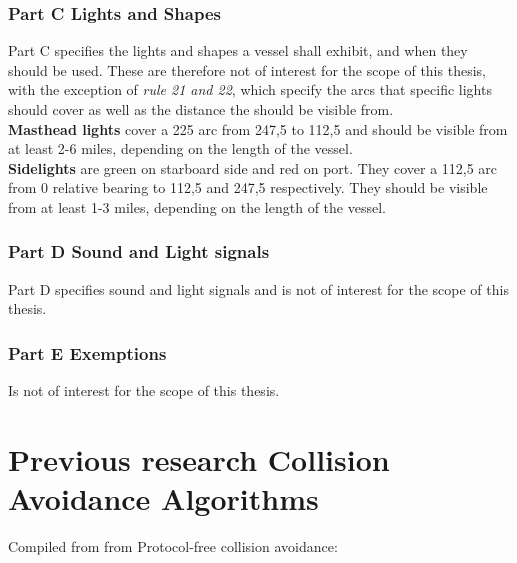 \subsubsection{Part C Lights and Shapes}
Part C specifies the lights and shapes a vessel shall exhibit, and when they should be used. These are therefore not of interest for the scope of this thesis, with the exception of \textit{rule 21 and 22}, which specify the arcs that specific lights should cover as well as the distance the should be visible from.
\\
\textbf{Masthead lights} cover a 225 \textdegree arc from 247,5 \textdegree to 112,5 \textdegree and should be visible from at least 2-6 miles, depending on the length of the vessel.\\
\textbf{Sidelights} are green on starboard side and red on port. They cover a 112,5 arc from 0 relative bearing to 112,5 and 247,5 respectively. They should be visible from at least 1-3 miles, depending on the length of the vessel.
\subsubsection{Part D Sound and Light signals}
Part D specifies sound and light signals and is not of interest for the scope of this thesis.
\subsubsection{Part E Exemptions}
Is not of interest for the scope of this thesis.



\section{Previous research Collision Avoidance Algorithms}
Compiled from from \cite{liu2016unmanned}
Protocol-free collision avoidance:

